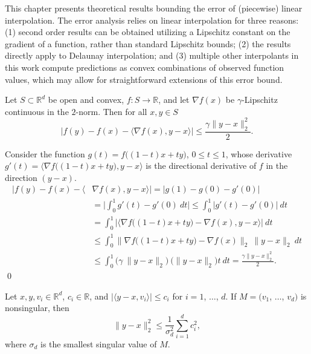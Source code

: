 
This chapter presents theoretical results bounding the error of
(piecewise) linear interpolation. The error analysis relies on linear
interpolation for three reasons: (1) second order results can be
obtained utilizing a Lipschitz constant on the gradient of a function,
rather than standard Lipschitz bounds; (2) the results directly apply
to Delaunay interpolation; and (3) multiple other interpolants in this
work compute predictions as convex combinations of observed function
values, which may allow for straightforward extensions of this error
bound.

\begin{plainlemma}
  \label{lemma:1}
  Let $S \subset \mathbb{R}^d$ be open and convex, $f: S \rightarrow
  \mathbb{R}$, and let $\nabla f(x)$ be $\gamma$-Lipschitz continuous
  in the $2$-norm. Then for all $x,y \in S$
  $$\big|f(y) - f(x) - \langle \nabla f(x), y - x \rangle \big| \leq \frac{\gamma \|y - x\|_2^2}{2}.$$
\end{plainlemma}

\begin{proofdot}
  Consider the function $g(t) = f \big((1-t) x + t y \big)$, $0 \leq t
  \leq 1$, whose derivative $g'(t) = \big\langle \nabla f \big((1-t) x
  + t y \big), y - x \big\rangle$ is the directional derivative of $f$
  in the direction $(y - x).$
  \begin{align*}
    \big|f(y) - f(x) - \langle &\nabla f(x), y - x \rangle \big|
        = \big|g(1) - g(0) - g'(0) \big| \\
       &= \bigg| \int_0^1 g'(t) - g'(0)\ dt \bigg| \leq \int_0^1 \big|g'(t) - g'(0)\big|\ dt \\
       &= \int_0^1 \bigg| \big \langle \nabla f\big((1-t)x + ty\big) - \nabla f(x), y - x \big \rangle \bigg|\ dt \\
       &\leq \int_0^1 \big \| \nabla f\big((1-t)x + ty\big) - \nabla f(x) \big \|_2\ \| y - x \|_2\ dt \\
       &\leq \int_0^1 \big ( \gamma\ \|y-x\|_2 \big) \ \big( \|y-x\|_2 \big) t\ dt = \frac{\gamma \|y - x\|_2^2}{2}.
  \end{align*}
  \qed
\end{proofdot}

\hfill

\begin{plainlemma}
  \label{lemma:2}
  Let $x, y, v_i \in \mathbb{R}^d$, $c_i \in \mathbb{R}$, and
  $|\langle y - x, v_i \rangle| \leq c_i$ for $i = 1$, $\ldots$, $d.$
  If $M = (v_1$, $\ldots$, $v_d)$ is nonsingular, then
  $$\|y - x\|_2^2 \leq \frac{1}{\sigma_d^2} \sum_{i=1}^d c_i^2,$$
  where $\sigma_d$ is the smallest singular value of $M.$
\end{plainlemma}

